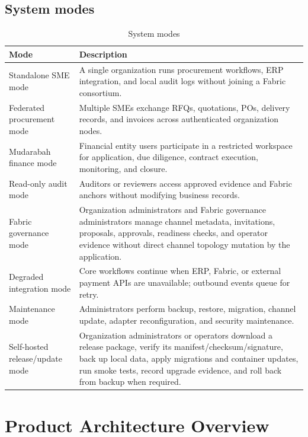 \documentclass[11pt,a4paper]{article}
\begin{document}
\subsection{System modes}
\begin{table}[h]
\centering
\begin{tabularx}{\textwidth}{@{}p{}X@{}}
\toprule
Mode & Description \\
\midrule
Standalone SME mode & A single organization runs procurement workflows, ERP integration, and local audit logs without joining a Fabric consortium. \\
Federated procurement mode & Multiple SMEs exchange RFQs, quotations, POs, delivery records, and invoices across authenticated organization nodes. \\
Mudarabah finance mode & Financial entity users participate in a restricted workspace for application, due diligence, contract execution, monitoring, and closure. \\
Read-only audit mode & Auditors or reviewers access approved evidence and Fabric anchors without modifying business records. \\
Fabric governance mode & Organization administrators and Fabric governance administrators manage channel metadata, invitations, proposals, approvals, readiness checks, and operator evidence without direct channel topology mutation by the application. \\
Degraded integration mode & Core workflows continue when ERP, Fabric, or external payment APIs are unavailable; outbound events queue for retry. \\
Maintenance mode & Administrators perform backup, restore, migration, channel update, adapter reconfiguration, and security maintenance. \\
Self-hosted release/update mode & Organization administrators or operators download a release package, verify its manifest/checksum/signature, back up local data, apply migrations and container updates, run smoke tests, record upgrade evidence, and roll back from backup when required. \\
\bottomrule
\end{tabularx}
\caption{System modes}
\end{table}

\section{Product Architecture Overview}
\end{document}
